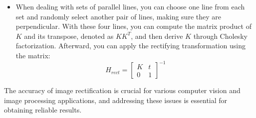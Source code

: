 \begin{enumerate}
\begin{itemize}
\begin{figure}[H]
                \end{figure}
            \item When dealing with sets of parallel lines, you can choose one line from each set and randomly select another pair of lines, making sure they are perpendicular. 
                With these four lines, you can compute the matrix product of $K$ and its transpose, denoted as $KK^T$, and then derive $K$ through Cholesky factorization.
                Afterward, you can apply the rectifying transformation using the matrix:
                \[H_{rect}=\begin{bmatrix}
                    K & t \\ 
                    0 & 1
                \end{bmatrix}^{-1}\] 
        \end{itemize}
\end{enumerate}
The accuracy of image rectification is crucial for various computer vision and image processing applications, and addressing these issues is essential for obtaining reliable results.